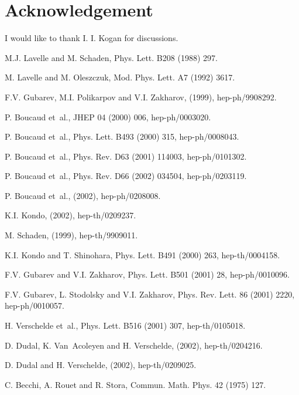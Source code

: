 \documentclass[a4paper,a4paper]{article}
\begin{document}
\section{Acknowledgement}
I would like to thank I. I. Kogan for discussions.
\begin{thebibliography}{10}

M.J. Lavelle and M. Schaden,
\newblock Phys. Lett. B208 (1988) 297.

M. Lavelle and M. Oleszczuk,
\newblock Mod. Phys. Lett. A7 (1992) 3617.

F.V. Gubarev, M.I. Polikarpov and V.I. Zakharov,
\newblock (1999), hep-ph/9908292.

P. Boucaud et~al.,
\newblock JHEP 04 (2000) 006, hep-ph/0003020.

P. Boucaud et~al.,
\newblock Phys. Lett. B493 (2000) 315, hep-ph/0008043.

P. Boucaud et~al.,
\newblock Phys. Rev. D63 (2001) 114003, hep-ph/0101302.

P. Boucaud et~al.,
\newblock Phys. Rev. D66 (2002) 034504, hep-ph/0203119.

P. Boucaud et~al.,
\newblock (2002), hep-ph/0208008.

K.I. Kondo,
\newblock (2002), hep-th/0209237.

M. Schaden,
\newblock (1999), hep-th/9909011.

K.I. Kondo and T. Shinohara,
\newblock Phys. Lett. B491 (2000) 263, hep-th/0004158.

F.V. Gubarev and V.I. Zakharov,
\newblock Phys. Lett. B501 (2001) 28, hep-ph/0010096.

F.V. Gubarev, L. Stodolsky and V.I. Zakharov,
\newblock Phys. Rev. Lett. 86 (2001) 2220, hep-ph/0010057.

H. Verschelde et~al.,
\newblock Phys. Lett. B516 (2001) 307, hep-th/0105018.

D. Dudal, K. Van~Acoleyen and H. Verschelde,
\newblock (2002), hep-th/0204216.

D. Dudal and H. Verschelde,
\newblock (2002), hep-th/0209025.

C. Becchi, A. Rouet and R. Stora,
\newblock Commun. Math. Phys. 42 (1975) 127.


\end{thebibliography}
\end{document}
